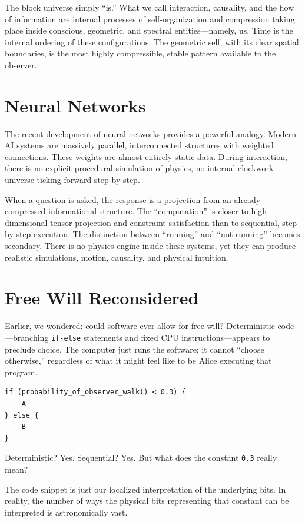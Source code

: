 The block universe simply ``is.'' What we call interaction, causality, and the flow of information are internal processes of self-organization and compression taking place inside conscious, geometric, and spectral entities---namely, us.
Time is the internal ordering of these configurations.
The geometric self, with its clear spatial boundaries, is the most highly compressible, stable pattern available to the observer.


\section{Neural Networks}

The recent development of neural networks provides a powerful analogy.
Modern AI systems are massively parallel, interconnected structures with weighted connections.
These weights are almost entirely static data.
During interaction, there is no explicit procedural simulation of physics, no internal clockwork universe ticking forward step by step.

When a question is asked, the response is a projection from an already compressed informational structure.
The ``computation'' is closer to high-dimensional tensor projection and constraint satisfaction than to sequential, step-by-step execution.
The distinction between ``running'' and ``not running'' becomes secondary.
There is no physics engine inside these systems, yet they can produce realistic simulations, motion, causality, and physical intuition.


\section{Free Will Reconsidered}

Earlier, we wondered: could software ever allow for free will? Deterministic code---branching \texttt{if-else} statements and fixed CPU instructions---appears to preclude choice.
The computer just runs the software; it cannot ``choose otherwise,'' regardless of what it might feel like to be Alice executing that program.

\begin{verbatim}
if (probability_of_observer_walk() < 0.3) {
    A
} else {
    B
}
\end{verbatim}

Deterministic? Yes.
Sequential? Yes.
But what does the constant \texttt{0.3} really mean? 

The code snippet is just our localized interpretation of the underlying bits. In reality, the number of ways the physical bits representing that constant can be interpreted is astronomically vast. 

